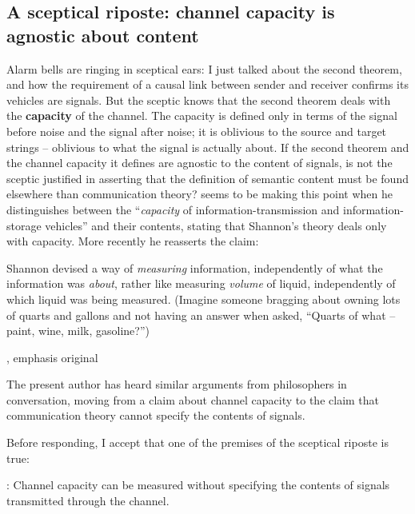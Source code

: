 \documentclass[12pt]{article}
\begin{document}
\subsection{A sceptical riposte: channel capacity is agnostic about content}

Alarm bells are ringing in sceptical ears: I just talked about the second theorem, and how the requirement of a causal link between sender and receiver confirms its vehicles are signals.
But the sceptic knows that the second theorem deals with the \textbf{capacity} of the channel.
The capacity is defined only in terms of the signal before noise and the signal after noise; it is oblivious to the source and target strings -- oblivious to what the signal is actually about.
If the second theorem and the channel capacity it defines are agnostic to the content of signals, is not the sceptic justified in asserting that the definition of semantic content must be found elsewhere than communication theory?
\citet[344]{dennett1983intentional} seems to be making this point when he distinguishes between the ``\textit{capacity} of information-transmission and information-storage vehicles'' and their contents, stating that Shannon's theory deals only with capacity.
More recently he reasserts the claim:

\begin{myquote}
Shannon devised a way of \textit{measuring} information, independently of what the information was \textit{about}, rather like measuring \textit{volume} of liquid, independently of which liquid was being measured. (Imagine someone bragging about owning lots of quarts and gallons and not having an answer when asked, ``Quarts of what -- paint, wine, milk, gasoline?'')
\par\hspace*{\fill}\citet[106]{dennett2017bacteria}, emphasis original
\end{myquote}

\noindent The present author has heard similar arguments from philosophers in conversation, moving from a claim about channel capacity to the claim that communication theory cannot specify the contents of signals.

Before responding, I accept that one of the premises of the sceptical riposte is true:

\begin{myquote}
\cia{}: Channel capacity can be measured without specifying the contents of signals transmitted through the channel.
\end{myquote}
\end{document}

